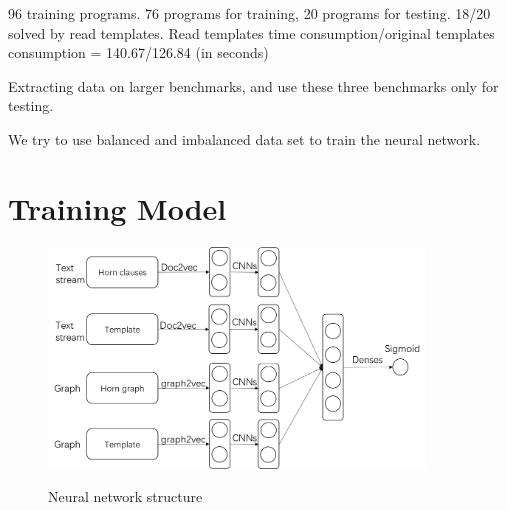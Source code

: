\documentclass{article}
\begin{document}
96 training programs. 76 programs for training, 20 programs for testing.
18/20 solved by read templates. Read templates time consumption/original templates consumption =  140.67/126.84 (in seconds)

Extracting data on larger benchmarks, and use these three benchmarks only for testing.






We try to use balanced and imbalanced data set to train the neural network.




\section{Training Model}


\begin{figure}[h]
\centering
  \includegraphics[width=10cm]{graph/NNstructure}\\
  \caption{Neural network structure}\label{NNstructure}
\end{figure}
\end{document}
